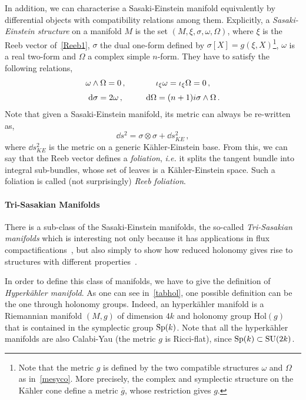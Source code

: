 \documentclass[debug]{phd}
\begin{document}
					In addition, we can characterise a Sasaki-Einstein manifold equivalently by differential objects with compatibility relations among them.
					Explicitly, a \emph{Sasaki-Einstein structure} on a manifold $M$ is the set $(M, \xi, \sigma, \omega, \Omega)$, where $\xi$ is the Reeb vector of~\eqref{Reeb1}, $\sigma$ the dual one-form defined by $\sigma\left[X \right] = g(\xi, X)$\footnote{%
						Note that the metric $g$ is defined by the two compatible structures $\omega$ and $\Omega$ as in~\eqref{mesyco}. More precisely, the complex and symplectic structure on the K\"ahler cone define a metric $\overline{g}$, whose restriction gives $g$.%
						},
					$\omega$ is a real two-form and $\Omega$ a complex simple $n$-form.
					They have to satisfy the following relations,
							\begin{equation}
								\begin{array}{c c c}
									\omega \wedge \Omega = 0 \, ,	&	\phantom{\dd}	&\iota_\xi \omega = \iota_\xi \Omega = 0 \, , \\[2mm]
									\dd \sigma = 2 \omega \, ,		&	\phantom{\dd}	&\dd \Omega = (n+1) i \sigma \wedge \Omega \, .
								\end{array}
							\end{equation}
					Note that given a Sasaki-Einstein manifold, its metric can always be re-written as,
							\begin{equation}
								\dd s^2 = \sigma \otimes \sigma + \dd s^2_{KE} \, ,
							\end{equation}
					where $\dd s^2_{KE}$ is the metric on a generic K\"ahler-Einstein base.
					From this, we can say that the Reeb vector defines a \emph{foliation}, \emph{i.e.} it splits the tangent bundle into integral sub-bundles, whose set of leaves is a K\"ahler-Einstein space.
					Such a foliation is called (not surprisingly) \emph{Reeb foliation}.
					
					\paragraph{Tri-Sasakian Manifolds} 
					There is a sub-class of the Sasaki-Einstein manifolds, the so-called \emph{Tri-Sasakian manifolds} which is interesting not only because it has applications in flux compactifications~\cite{DavideTriSas}, but also simply to show how reduced holonomy gives rise to structures with different properties~\cite{TriSasakiReview}.
					
					In order to define this class of manifolds, we have to give the definition of \emph{Hyperk\"ahler manifold}.
					As one can see in~\cref{tabhol}, one possible definition can be the one through holonomy groups.
					Indeed, an hyperk\"ahler manifold is a Riemannian manifold $(M,g)$ of dimension $4k$ and holonomy group $\mathrm{Hol}(g)$ that is contained in the symplectic group $\mathrm{Sp}(k)$.
					Note that all the hyperk\"ahler manifolds are also Calabi-Yau (the metric $g$ is Ricci-flat), since $\mathrm{Sp}(k) \subset \mathrm{SU}(2k)$.
					
\end{document}
